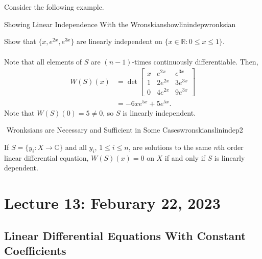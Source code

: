         \vphantom
        \\
        \\
        Consider the following example.
        \begin{example}{Showing Linear Independence With the Wronskian}{showlinindepwronksian}

            Show that \(\{x,e^{2x},e^{3x}\}\) are linearly independent on \(\{x\in\mathbb{R}:0\leq x\leq 1\}\).
            \\
            \\
            Note that all elements of \(S\) are \((n-1)\)-times continuously differentiable. Then,
            \begin{align*}
                W(S)(x)&=\det\begin{bmatrix}
                    x & e^{2x} & e^{3x} \\
                    1 & 2e^{2x} & 3e^{3x} \\
                    0 & 4e^{2x} & 9e^{3x}
                \end{bmatrix} \\
                &=-6xe^{5x}+5e^{5x}.
            \end{align*}
            Note that \(W(S)(0)=5\neq0\), so \(S\) is linearly independent.
            
        \end{example}
        \begin{theorem}{\Stop\,\,Wronksians are Necessary and Sufficient in Some Cases}{wronskianslinindep2}

            If \(S=\{y_i:X\to\mathbb{C}\}\) and all \(y_i\), \(1\leq i\leq n\), are solutions to the same \(n\)th order linear differential equation, \(W(S)(x)=0\) on \(X\) if and only if \(S\) is linearly dependent.
            
        \end{theorem}

\pagebreak

\section{Lecture 13: Feburary 22, 2023}

    \subsection{Linear Differential Equations With Constant Coefficients}

